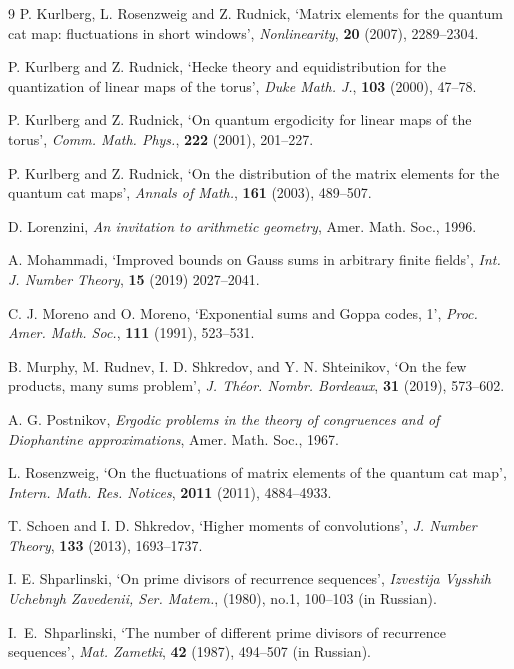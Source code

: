 \documentclass[12pt]{amsart}
\begin{document}
\begin{thebibliography}{9}
  P. Kurlberg, L.  Rosenzweig and Z. Rudnick, `Matrix elements for the quantum cat map: fluctuations in short windows',  {\it Nonlinearity\/}, {\bf 20} (2007),   2289--2304.
 
  P. Kurlberg and Z. Rudnick, `Hecke theory and equidistribution for the quantization of linear maps of the torus',  {\it Duke Math. J.\/}, {\bf  103} (2000),  47--78. 

 P. Kurlberg and Z. Rudnick, `On quantum ergodicity for linear maps of the
torus',    {\it Comm. Math. Phys.\/}, {\bf  222} (2001), 201--227. 

 P. Kurlberg and Z. Rudnick, `On the distribution of the matrix elements for
the quantum cat maps',  {\it Annals of Math.\/}, {\bf 161} (2003),  489--507.

D. Lorenzini,
{\it An invitation to arithmetic geometry\/},
Amer. Math. Soc., 1996.

 A. Mohammadi, `Improved bounds on Gauss sums in arbitrary finite fields',
{\it Int. J.  Number Theory\/}, {\bf 15} (2019) 2027--2041. 

 C. J. Moreno and O. Moreno, `Exponential
sums and Goppa codes, 1', {\it Proc. Amer. Math.  Soc.\/},
{\bf 111} (1991), 523--531.


 B. Murphy, M. Rudnev, I. D. Shkredov, and Y. N. Shteinikov, 
`On the few products, many sums problem',
{\it J. Th{\'e}or.  Nombr. Bordeaux\/}, {\bf 31} (2019), 573--602.

 A. G. Postnikov, 
{\it Ergodic problems in the theory of congruences and
of Diophantine approximations\/},
Amer. Math. Soc.,  1967. 

   L.  Rosenzweig, `On the fluctuations of matrix elements of the quantum cat map',  {\it  Intern. Math. Res. Notices\/}, {\bf 2011} (2011),  4884--4933.


  
 T. Schoen and  I.  D. Shkredov, 
`Higher moments of convolutions',
{\it J. Number Theory\/}, {\bf 133} (2013), 1693--1737. 

 I. E. Shparlinski, 
`On prime divisors of recurrence sequences',
{\it Izvestija Vysshih Uchebnyh Zavedenii, Ser. Matem.\/}, 
(1980), no.1, 100--103 (in Russian).

I.~E.~Shparlinski, `The number of different prime divisors of recurrence sequences',
{\it Mat. Zametki\/}, {\bf 42} (1987),  494--507 (in Russian). 


\end{thebibliography}
\end{document}
